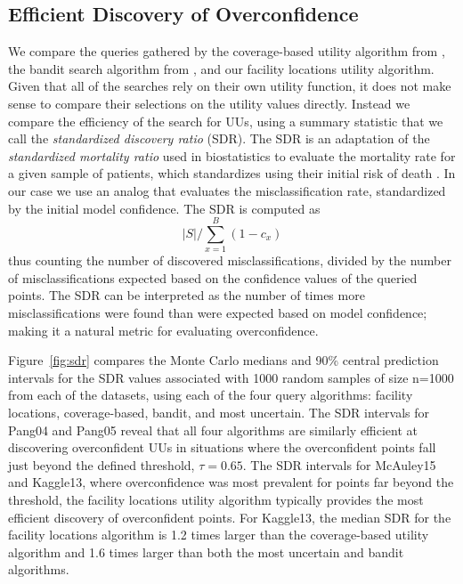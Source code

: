 \documentclass[10pt, conference]{IEEEtran}
\begin{document}
\subsection{Efficient Discovery of Overconfidence}

We compare the queries gathered by the coverage-based utility algorithm from \cite{Bansal2018}, the bandit search algorithm from \cite{Lakkaraju2016}, and our facility locations utility algorithm. Given that all of the searches rely on their own utility function, it does not make sense to compare their selections on the utility values directly. Instead we compare the efficiency of the search for UUs, using a summary statistic that we call the \textit{standardized discovery ratio} (SDR). The SDR is an adaptation of the \textit{standardized mortality ratio} used in biostatistics to evaluate the mortality rate for a given sample of patients, which standardizes using their initial risk of death \cite{taylor2013standardized} \cite{rosner2015fundamentals}. In our case we use an analog that evaluates the misclassification rate, standardized by the initial model confidence. The SDR is computed as 
$$ |S| / \sum_{x=1}^B(1- c_x) $$
thus counting the number of discovered misclassifications, divided by the number of misclassifications expected based on the confidence values of the queried points. The SDR can be interpreted as the number of times more misclassifications were found than were expected based on model confidence; making it a natural metric for evaluating overconfidence.

Figure~\ref{fig:sdr} compares the Monte Carlo medians and 90\%  central prediction intervals for the SDR values associated with 1000 random samples of size n=1000 from each of the datasets, using each of the four query algorithms: facility locations, coverage-based, bandit, and most uncertain. The SDR intervals for Pang04 and Pang05 reveal that all four algorithms are similarly efficient at discovering overconfident UUs in situations where the overconfident points fall just beyond the defined threshold, $\tau = 0.65$. The SDR intervals for McAuley15 and Kaggle13, where overconfidence was most prevalent for points far beyond the threshold, the facility locations utility algorithm typically provides the most efficient discovery of overconfident points. For Kaggle13, the median SDR for the facility locations algorithm is 1.2 times larger than the coverage-based utility algorithm and 1.6 times larger than both the most uncertain and bandit algorithms.
\end{document}
